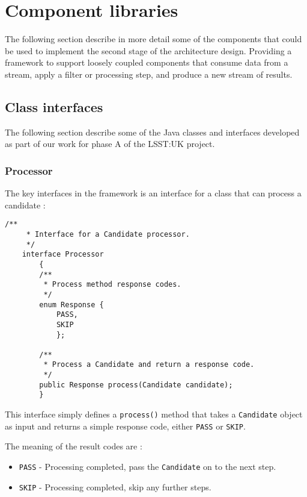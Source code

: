 \documentclass{article}
\newcommand{\phasea} {phase A\xspace}
\newcommand{\lsstuk} {LSST:UK\xspace}
\begin{document}
\section{Component libraries}
\label{component-libraries}

The following section describe in more detail some of the components that could be used to implement the second stage of the architecture design. Providing a framework to support loosely coupled components that consume data from a stream, apply a filter or processing step, and produce a new stream of results.

\subsection{Class interfaces}
\label{component-libraries.java-interfaces}

The following section describe some of the Java classes and interfaces developed as part of our work for \phasea of the \lsstuk project. 

\subsubsection{Processor}
\label{java-interfaces.Processor}

The key interfaces in the framework is an interface for a class that can process a candidate :

\begin{lstlisting}[style=Java]
    /**
     * Interface for a Candidate processor.
     */
    interface Processor
        {
        /**
         * Process method response codes.
         */
        enum Response {
            PASS,
            SKIP
            };

        /**
         * Process a Candidate and return a response code.
         */
        public Response process(Candidate candidate);
        }
\end{lstlisting}

This interface simply defines a \texttt{process()} method that takes a \texttt{Candidate} object as input and
returns a simple response code, either \texttt{PASS} or \texttt{SKIP}.

The meaning of the result codes are :
\begin{itemize}
  \item \texttt{PASS} - Processing completed, pass the \texttt{Candidate} on to the next step.
  \item \texttt{SKIP} - Processing completed, skip any further steps.
\end{itemize}
\end{document}

